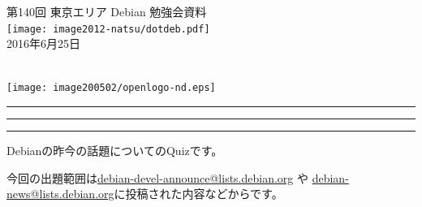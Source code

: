\documentclass[mingoth,a4paper]{jsarticle}
\newcommand{\debmtgyear}{2016}
\newcommand{\debmtgmonth}{6}
\newcommand{\debmtgdate}{25}
\newcommand{\debmtgnumber}{140}
\begin{document}
\begin{titlepage}
\thispagestyle{empty}

\vspace*{-2cm}
第\debmtgnumber{}回 東京エリア Debian 勉強会資料\\
\hspace*{-2cm}
\texttt{[image: image2012-natsu/dotdeb.pdf]}\\
\hfill{}\debmtgyear{}年\debmtgmonth{}月\debmtgdate{}日

\\

\vspace*{-2cm}
\hfill{}\texttt{[image: image200502/openlogo-nd.eps]}
\end{titlepage}

\newpage

\begin{minipage}[b]{0.2\hsize}
 \colorbox{titleback}{}
\end{minipage}
\begin{minipage}[b]{0.8\hsize}
\hrule
\vspace{2mm}
\hrule
\begin{multicols}{2}
\tableofcontents
\end{multicols}
\vspace{2mm}
\hrule
\end{minipage}

%
%


Debianの昨今の話題についてのQuizです。

今回の出題範囲は\url{debian-devel-announce@lists.debian.org} や \url{debian-news@lists.debian.org}に投稿された内容などからです。
\end{document}
